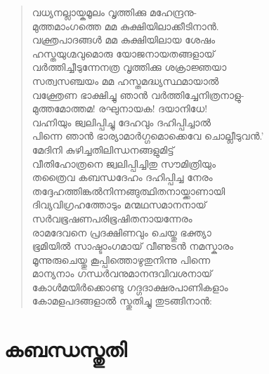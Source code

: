 \begin{verse}
വധ്യനല്ലായ്കമൂലം വൃത്തിക്കു മഹേന്ദ്രനു-\\
മുത്തമാംഗത്തെ മമ കുക്ഷിയിലാക്കീടിനാന്‍.\\
വക്ത്രപാദങ്ങള്‍ മമ കുക്ഷിയിലായ ശേഷം\\
ഹസ്തയുഗ്മവുമൊരു യോജനായതങ്ങളായ്\\
വര്‍ത്തിച്ചീടുന്നേനത്ര വൃത്തിക്കു ശക്രാജ്ഞയാ\\
സത്വസഞ്ചയം മമ ഹസ്തമദ്ധ്യസ്ഥമായാല്‍\\
വക്ത്രേണ ഭാക്ഷിച്ചു ഞാന്‍ വര്‍ത്തിച്ചേനിത്രനാളു-\\
മുത്തമോത്തമ! രഘുനായക! ദയാനിധേ!\\
വഹ്നിയും ജ്വലിപ്പിച്ചു ദേഹവും ദഹിപ്പിച്ചാല്‍\\
പിന്നെ ഞാന്‍ ഭാര്യാമാര്‍ഗ്ഗമൊക്കെവേ ചൊല്ലീടുവന്‍.’\\
മേദിനി കുഴിച്ചതിലിന്ധനങ്ങളുമിട്ട്\\
വീതിഹോത്രനെ ജ്വലിപ്പിച്ചിതു സൗമിത്രിയും\\
തത്രൈവ കബന്ധദേഹം ദഹിപ്പിച്ച നേരം\\
തദ്ദേഹത്തിങ്കല്‍നിന്നങ്ങുത്ഥിതനായ്ക്കാണായി\\
ദിവ്യവിഗ്രഹത്തോടും മന്മഥസമാനനായ്\\
സര്‍വഭൂഷണപരിഭൂഷിതനായന്നേരം\\
രാമദേവനെ പ്രദക്ഷിണവും ചെയ്തു ഭക്ത്യാ\\
ഭൂമിയില്‍ സാഷ്ടാംഗമായ് വീണുടന്‍ നമസ്കാരം\\
മൂന്നുരുചെയ്തു കൂപ്പിത്തൊഴുതുനിന്നു പിന്നെ\\
മാന്യനാം ഗന്ധര്‍വനുമാനന്ദവിവശനായ്\\
കോള്‍മയിര്‍ക്കൊണ്ടു ഗദ്ഗദാക്ഷരപാണികളാം\\
കോമളപദങ്ങളാല്‍ സ്തുതിച്ചു തുടങ്ങിനാന്‍:
\end{verse}

\section{കബന്ധസ്തുതി}

